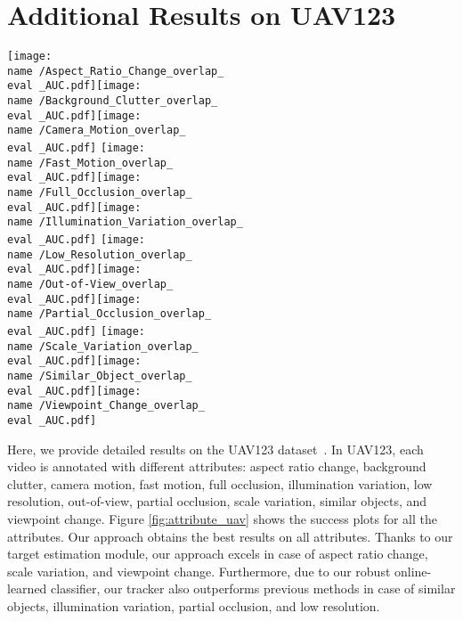 \documentclass[10pt,twocolumn,letterpaper]{article}
\begin{document}
\section{Additional Results on UAV123}
\label{sec:additional_results}
	
\begin{figure*}[!t]
	\centering
	\newcommand{\wid}{0.33\textwidth}
	\newcommand{\name}{figures/att_uav}
	\newcommand{\eval}{OPE}
	\texttt{[image: \\name /Aspect\_Ratio\_Change\_overlap\_\\eval \_AUC.pdf]}\texttt{[image: \\name /Background\_Clutter\_overlap\_\\eval \_AUC.pdf]}\texttt{[image: \\name /Camera\_Motion\_overlap\_\\eval \_AUC.pdf]}
	\texttt{[image: \\name /Fast\_Motion\_overlap\_\\eval \_AUC.pdf]}\texttt{[image: \\name /Full\_Occlusion\_overlap\_\\eval \_AUC.pdf]}\texttt{[image: \\name /Illumination\_Variation\_overlap\_\\eval \_AUC.pdf]}
	\texttt{[image: \\name /Low\_Resolution\_overlap\_\\eval \_AUC.pdf]}\texttt{[image: \\name /Out-of-View\_overlap\_\\eval \_AUC.pdf]}\texttt{[image: \\name /Partial\_Occlusion\_overlap\_\\eval \_AUC.pdf]}
	\texttt{[image: \\name /Scale\_Variation\_overlap\_\\eval \_AUC.pdf]}\texttt{[image: \\name /Similar\_Object\_overlap\_\\eval \_AUC.pdf]}\texttt{[image: \\name /Viewpoint\_Change\_overlap\_\\eval \_AUC.pdf]}
	\caption{Attribute analysis on the UAV123 dataset. Our approach \textbf{ATOM} obtains the best performance on all 12 attributes.}
	\label{fig:attribute_uav}
\end{figure*}
	
	Here, we provide detailed results on the UAV123 dataset~\cite{UAV123}. In UAV123, each video is annotated with  different attributes: aspect ratio change, background clutter, camera motion, fast motion, full occlusion, illumination variation, low resolution, out-of-view, partial occlusion, scale variation, similar objects, and viewpoint change. Figure \ref{fig:attribute_uav} shows the success plots for all the attributes. Our approach obtains the best results on all  attributes. Thanks to our target estimation module, our approach excels in case of aspect ratio change, scale variation, and viewpoint change. Furthermore, due to our robust online-learned classifier, our tracker also outperforms previous methods in case of similar objects, illumination variation, partial occlusion, and low resolution. 
\end{document}
